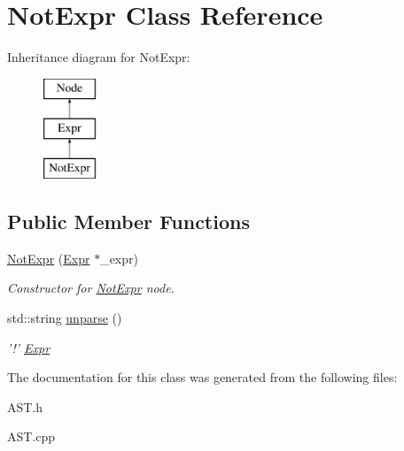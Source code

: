\hypertarget{classNotExpr}{\section{Not\-Expr Class Reference}
\label{classNotExpr}
}
Inheritance diagram for Not\-Expr\-:\begin{figure}[H]
\begin{center}
\leavevmode
\includegraphics[height=3.000000cm]{classNotExpr}
\end{center}
\end{figure}
\subsection*{Public Member Functions}
\begin{DoxyCompactItemize}
\item 
\hypertarget{classNotExpr_a32d8529fc0f1e411b6a652a372202c7a}{\hyperlink{classNotExpr_a32d8529fc0f1e411b6a652a372202c7a}{Not\-Expr} (\hyperlink{classExpr}{Expr} $\ast$\-\_\-expr)}\label{classNotExpr_a32d8529fc0f1e411b6a652a372202c7a}

\begin{DoxyCompactList}\small\item\em Constructor for \hyperlink{classNotExpr}{Not\-Expr} node. \end{DoxyCompactList}\item 
\hypertarget{classNotExpr_ab49f96d8f23e3fa6bb21376dc0fa5215}{std\-::string \hyperlink{classNotExpr_ab49f96d8f23e3fa6bb21376dc0fa5215}{unparse} ()}\label{classNotExpr_ab49f96d8f23e3fa6bb21376dc0fa5215}

\begin{DoxyCompactList}\small\item\em '!' \hyperlink{classExpr}{Expr} \end{DoxyCompactList}\end{DoxyCompactItemize}


The documentation for this class was generated from the following files\-:\begin{DoxyCompactItemize}
\item 
A\-S\-T.\-h\item 
A\-S\-T.\-cpp\end{DoxyCompactItemize}
